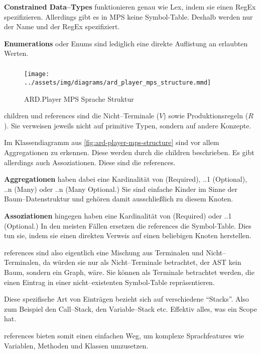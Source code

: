 \textbf{Constrained Data--Types} funktionieren genau wie Lex, indem sie einen \ac{RegEx} spezifizieren.
Allerdings gibt es in \ac{MPS} keine Symbol-Table.
Deshalb werden nur der Name und der \ac{RegEx} spezifiziert.

\textbf{Enumerations} oder Enums sind lediglich eine direkte Auflistung an erlaubten Werten.

\subparagraph*{}
\begin{figure}
    \texttt{[image: ../assets/img/diagrams/ard\_player\_mps\_structure.mmd]}
    \caption{\acs{ARD}.Player MPS Sprache Struktur}
    \label{fig:ard-player-mps-structure}
\end{figure}
{\ttfamily children} und {\ttfamily references} sind die Nicht--Terminale ($V$) sowie Produktionsregeln ($R$).
Sie verweisen jeweils nicht auf primitive Typen, sondern auf andere Konzepte.

Im Klassendiagramm aus \autoref{fig:ard-player-mps-structure} sind vor allem Aggregationen zu erkennen.
Diese werden durch die {\ttfamily children} beschrieben.
Es gibt allerdings auch Assoziationen.
Diese sind die {\ttfamily references}.

\textbf{Aggregationen} haben dabei eine Kardinalität von {} (Required), {..1} (Optional), {..n} (Many) oder {..n} (Many Optional.)
Sie sind einfache Kinder im Sinne der Baum--Datenstruktur und gehören damit ausschließlich zu diesem Knoten.

\textbf{Assoziationen} hingegen haben eine Kardinalität von {} (Required) oder {..1} (Optional.)
In den meisten Fällen ersetzen die {\ttfamily references} die Symbol-Table.
Dies tun sie, indem sie einen direkten Verweis auf einen beliebigen Knoten herstellen.

{\ttfamily references} sind also eigentlich eine Mischung aus Terminalen und Nicht--Terminalen, da würden sie nur als Nicht--Terminale betrachtet, der \ac{AST} kein Baum, sondern ein Graph, wäre.
Sie können als Terminale betrachtet werden, die einen Eintrag in einer nicht--existenten Symbol-Table repräsentieren.

Diese spezifische Art von Einträgen bezieht sich auf verschiedene \enquote{Stacks}.
Also zum Beispiel den Call--Stack, den Variable--Stack etc.
Effektiv alles, was ein Scope hat.

{\ttfamily references} bieten somit einen einfachen Weg, um komplexe Sprachfeatures wie Variablen, Methoden und Klassen umzusetzen.

